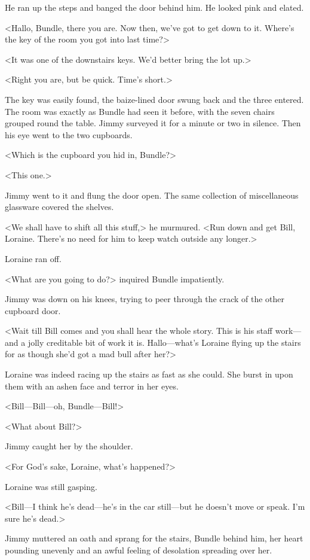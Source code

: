 He ran up the steps and banged the door behind him. He looked pink and elated.

<Hallo, Bundle, there you are. Now then, we've got to get down to it. Where's the key of the room you got into last time?>

<It was one of the downstairs keys. We'd better bring the lot up.>

<Right you are, but be quick. Time's short.>

The key was easily found, the baize-lined door swung back and the three entered. The room was exactly as Bundle had seen it before, with the seven chairs grouped round the table. Jimmy surveyed it for a minute or two in silence. Then his eye went to the two cupboards.

<Which is the cupboard you hid in, Bundle?>

<This one.>

Jimmy went to it and flung the door open. The same collection of miscellaneous glassware covered the shelves.

<We shall have to shift all this stuff,> he murmured. <Run down and get Bill, Loraine. There's no need for him to keep watch outside any longer.>

Loraine ran off.

<What are you going to do?> inquired Bundle impatiently.

Jimmy was down on his knees, trying to peer through the crack of the other cupboard door.

<Wait till Bill comes and you shall hear the whole story. This is his staff work—and a jolly creditable bit of work it is. Hallo—what's Loraine flying up the stairs for as though she'd got a mad bull after her?>

Loraine was indeed racing up the stairs as fast as she could. She burst in upon them with an ashen face and terror in her eyes.

<Bill—Bill—oh, Bundle—Bill!>

<What about Bill?>

Jimmy caught her by the shoulder.

<For God's sake, Loraine, what's happened?>

Loraine was still gasping.

<Bill—I think he's dead—he's in the car still—but he doesn't move or speak. I'm sure he's dead.>

Jimmy muttered an oath and sprang for the stairs, Bundle behind him, her heart pounding unevenly and an awful feeling of desolation spreading over her.

